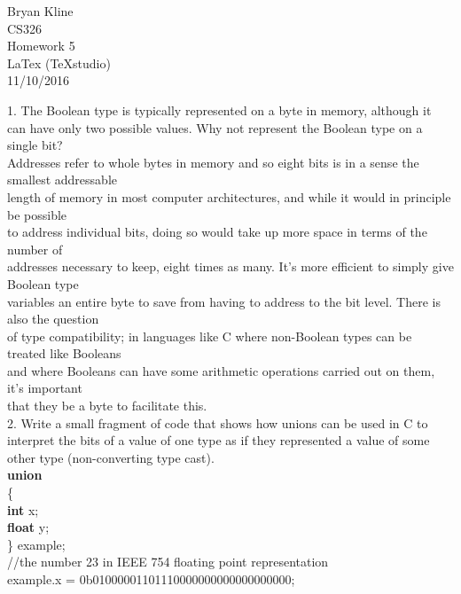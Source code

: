 \documentclass[12pt]{article}
\begin{document}
\begin{center}

\Huge
Bryan Kline\\
[10mm]
CS326\\ 
[10mm]
Homework 5\\
\small LaTex (TeXstudio)\\
[10mm]
\Huge
11/10/2016\\
[200mm]

\end{center}

\begin{flushleft}

1. The Boolean type is typically represented on a byte in memory, although it can have only two possible values. Why not represent the Boolean type on a single bit?\\
[2mm]

\qquad Addresses refer to whole bytes in memory and so eight bits is in a sense the smallest addressable\\
\qquad length of memory in most computer architectures, and while it would in principle be possible\\
\qquad to address individual bits, doing so would take up more space in terms of the number of\\
\qquad addresses necessary to keep, eight times as many.  It's more efficient to simply give Boolean type\\
\qquad variables an entire byte to save from having to address to the bit level.  There is also the question\\
\qquad of type compatibility; in languages like C where non-Boolean types can be treated like Booleans\\
\qquad and where Booleans can have some arithmetic operations carried out on them, it's important\\
\qquad that they be a byte to facilitate this.\\
[4mm]


2. Write a small fragment of code that shows how unions can be used in C to interpret the bits of a value of one type as if they represented a value of some other type (non-converting type cast).\\
[2mm]

{\selectfont
\qquad \qquad \textbf{union}\\
\qquad \qquad \{\\
\qquad \qquad \qquad \textbf{int} x;\\
\qquad \qquad \qquad \textbf{float} y;\\
\qquad \qquad \} example;\\
[2mm]    
\qquad \qquad //the number 23 in IEEE 754 floating point representation\\
\qquad \qquad example.x = 0b01000001101110000000000000000000;\\
[2mm]   

}
\end{flushleft}
\end{document}
